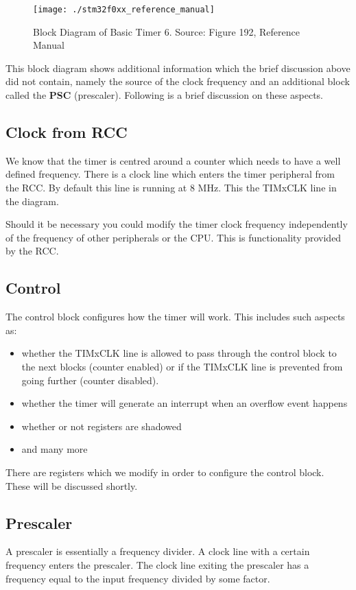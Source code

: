 \begin{figure}
\centering
\texttt{[image: ./stm32f0xx\_reference\_manual]}
\caption{Block Diagram of Basic Timer 6. Source: Figure 192, Reference Manual}
\label{fig:timer_basic_diagram}
\end{figure}

This block diagram shows additional information which the brief discussion above did not contain, namely the source of the clock frequency and an additional block called the \textbf{PSC} (prescaler). Following is a brief discussion on these aspects.

\subsection{Clock from RCC}
We know that the timer is centred around a counter which needs to have a well defined frequency. There is a clock line which enters the timer peripheral from the RCC. By default this line is running at 8 MHz. This the TIMxCLK line in the diagram. 

Should it be necessary you could modify the timer clock frequency independently of the frequency of other peripherals or the CPU. 
This is functionality provided by the RCC. 

\subsection{Control}
The control block configures how the timer will work. This includes such aspects as:
\begin{itemize}
\item whether the TIMxCLK line is allowed to pass through the control block to the next blocks (counter enabled) or if the TIMxCLK line is prevented from going further (counter disabled).
\item whether the timer will generate an interrupt when an overflow event happens
\item whether or not registers are shadowed
\item and many more
\end{itemize}

There are registers which we modify in order to configure the control block. These will be discussed shortly. 

\subsection{Prescaler}
A prescaler is essentially a frequency divider. A clock line with a certain frequency enters the prescaler. The clock line exiting the prescaler has a frequency equal to the input frequency divided by some factor. 

